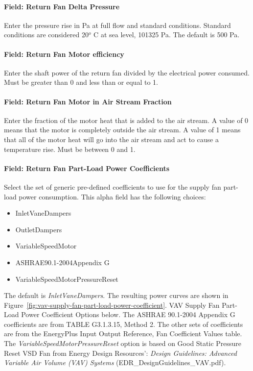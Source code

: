 \paragraph{Field: Return Fan Delta Pressure}\label{field-return-fan-delta-pressure-6}

Enter the pressure rise in Pa at full flow and standard conditions. Standard conditions are considered 20\(^{o}\) C at sea level, 101325 Pa. The default is 500 Pa.

\paragraph{Field: Return Fan Motor efficiency}\label{field-return-fan-motor-efficiency-6}

Enter the shaft power of the return fan divided by the electrical power consumed. Must be greater than 0 and less than or equal to 1.

\paragraph{Field: Return Fan Motor in Air Stream Fraction}\label{field-return-fan-motor-in-air-stream-fraction-6}

Enter the fraction of the motor heat that is added to the air stream. A value of 0 means that the motor is completely outside the air stream. A value of 1 means that all of the motor heat will go into the air stream and act to cause a temperature rise. Must be between 0 and 1.

\paragraph{Field: Return Fan Part-Load Power Coefficients}\label{field-return-fan-part-load-power-coefficients-2}

Select the set of generic pre-defined coefficients to use for the supply fan part-load power consumption. This alpha field has the following choices:

\begin{itemize}
\item
  InletVaneDampers
\item
  OutletDampers
\item
  VariableSpeedMotor
\item
  ASHRAE90.1-2004Appendix G
\item
  VariableSpeedMotorPressureReset
\end{itemize}

The default is \emph{InletVaneDampers}. The resulting power curves are shown in Figure~\ref{fig:vav-supply-fan-part-load-power-coefficient}. VAV Supply Fan Part-Load Power Coefficient Options below. The ASHRAE 90.1-2004 Appendix G coefficients are from TABLE G3.1.3.15, Method 2. The other sets of coefficients are from the EnergyPlus Input Output Reference, Fan Coefficient Values table. The \emph{VariableSpeedMotorPressureReset} option is based on Good Static Pressure Reset VSD Fan from Energy Design Resources': \emph{Design Guidelines: Advanced Variable Air Volume (VAV) Systems} (EDR\_DesignGuidelines\_VAV.pdf).


